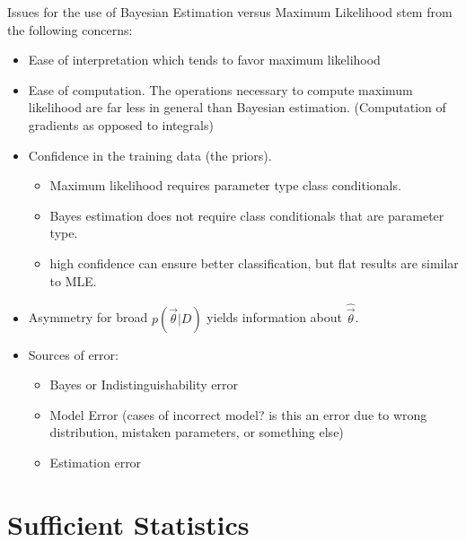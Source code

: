 \documentclass[11pt]{article}
\begin{document}
Issues for the use of Bayesian Estimation versus Maximum Likelihood stem from the following concerns:
\begin{itemize}
	\item Ease of interpretation which tends to favor maximum likelihood
	\item Ease of computation.  The operations necessary to compute maximum likelihood are far less in general than Bayesian estimation.  (Computation of gradients as opposed to integrals)
	\item Confidence in the training data (the priors).  
	\begin{itemize}
		\item Maximum likelihood requires parameter type class conditionals.  
		\item Bayes estimation does not require class conditionals that are parameter type.
		\item high confidence can ensure better classification, but flat results are similar to MLE.
	\end{itemize}
	\item Asymmetry for broad $p(\vec{\theta}| D)$ yields information about $\hat{\vec{\theta}}$.
	\item Sources of error:
	\begin{itemize}
		\item Bayes or Indistinguishability error
		\item Model Error (cases of incorrect model? is this an error due to wrong distribution,  mistaken parameters, or something else)
		\item Estimation error
	\end{itemize}
	
\end{itemize}
 
\section{Sufficient Statistics}
\end{document}
